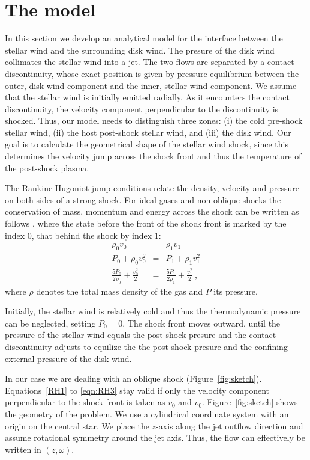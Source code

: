 \section{The model}

In this section we develop an analytical model for the interface between the stellar wind and the surrounding disk wind. The presure of the disk wind collimates the stellar wind into a jet. The two flows are separated by a contact discontinuity, whose exact position is given by pressure equilibrium between the outer, disk wind component and the inner, stellar wind component. We assume that the stellar wind is initially emitted radially. As it encounters the contact discontinuity, the velocity component perpendicular to the discontinuity is shocked. Thus, our model needs to distinguish three zones: (i) the cold pre-shock stellar wind, (ii) the host post-shock stellar wind, and (iii) the disk wind. Our goal is to calculate the geometrical shape of the stellar wind shock, since this determines the velocity jump across the shock front and thus the temperature of the post-shock plasma. 

The Rankine-Hugoniot jump conditions relate the density, velocity and pressure on both sides of a strong shock. For ideal gases and non-oblique shocks the conservation of mass, momentum and energy across the shock can be written as follows \citep[][chap.~7, \S~15]{http://adsabs.harvard.edu/abs/1967pswh.book.....Z}, where the state before the front of the shock front is marked by the index 0, that behind the shock by index 1:
\begin{eqnarray}
\label{eqn:RH1}\rho_0 v_0 &=& \rho_1 v_1\\
\label{eqn:RH2}P_0+\rho_0 v_0^2 &=& P_1+\rho_1 v_1^2\\
\label{eqn:RH3}\frac{5 P_0}{2\rho_0}+\frac{v_0^2}{2}&=&\frac{5 P_1}{2\rho_1}+\frac{v_1^2}{2} \ ,
\end{eqnarray}
where $\rho$ denotes the total mass density of the gas and $P$ its pressure. 

Initially, the stellar wind is relatively cold and thus the thermodynamic pressure can be neglected, setting $P_0=0$.
The shock front moves outward, until the pressure of the stellar wind equals the post-shock presure and the contact discontinuity adjusts to equilize the the post-shock presure and the confining external pressure of the disk wind. 

In our case we are dealing with an oblique shock (Figure~\ref{fig:sketch}). Equations~\ref{RH1} to \ref{eqn:RH3} stay valid if only the velocity component perpendicular to the shock front is taken as $v_0$ and $v_0$. 
Figure~\ref{fig:sketch} shows the geometry of the problem. We use a cylindrical coordinate system with an origin on the central star. We place the $z$-axis along the jet outflow direction and assume rotational symmetry around the jet axis. Thus, the flow can effectively be written in $(z,\omega)$. 

